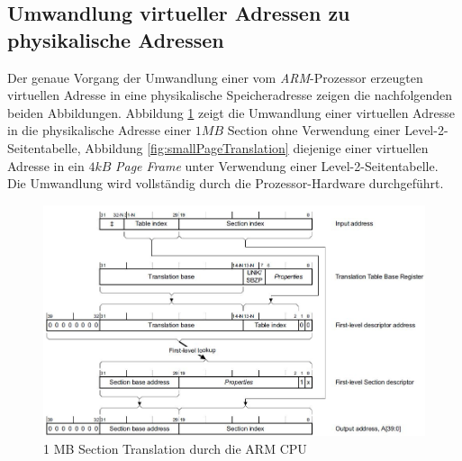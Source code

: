 \subsection{Umwandlung virtueller Adressen zu physikalische Adressen}

Der genaue Vorgang der Umwandlung einer vom \textit{ARM}-Prozessor erzeugten virtuellen Adresse in eine physikalische Speicheradresse zeigen die nachfolgenden beiden Abbildungen. Abbildung  \ref{fig:sectionTranslation} zeigt die Umwandlung einer virtuellen Adresse in die physikalische Adresse einer $1MB$ Section ohne Verwendung einer Level-2-Seitentabelle, Abbildung \ref{fig:smallPageTranslation} diejenige einer virtuellen Adresse in ein $4kB$ \textit{Page Frame} unter Verwendung einer Level-2-Seitentabelle. Die Umwandlung wird vollständig durch die Prozessor-Hardware durchgeführt.\\


\begin{figure}[H]
	\includegraphics[scale=0.8]{chapters/mmu/figures/sectionTranslation}
	\caption{1 MB Section Translation durch die ARM CPU \cite[S. B3-1335]{ARM:ARM}}
	\label{fig:sectionTranslation}
\end{figure}

